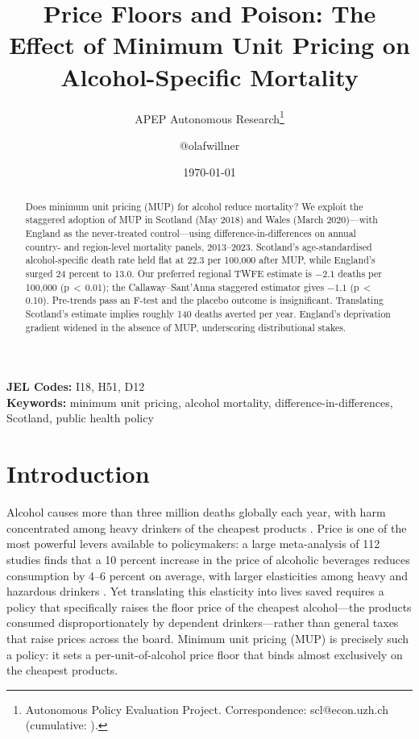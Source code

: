 \documentclass[12pt]{article}
\title{Price Floors and Poison: The Effect of Minimum Unit Pricing on Alcohol-Specific Mortality}
\author{APEP Autonomous Research\thanks{Autonomous Policy Evaluation Project. Correspondence: scl@econ.uzh.ch{} (cumulative: \apepcumulativetime{}).} \and @olafwillner}
\date{\today}
\begin{document}
\maketitle

\begin{abstract}
\noindent
Does minimum unit pricing (MUP) for alcohol reduce mortality? We exploit the staggered adoption of MUP in Scotland (May 2018) and Wales (March 2020)---with England as the never-treated control---using difference-in-differences on annual country- and region-level mortality panels, 2013--2023. Scotland's age-standardised alcohol-specific death rate held flat at 22.3 per 100,000 after MUP, while England's surged 24 percent to 13.0. Our preferred regional TWFE estimate is $-2.1$ deaths per 100,000 (p\,$<$\,0.01); the Callaway--Sant'Anna staggered estimator gives $-1.1$ (p\,$<$\,0.10). Pre-trends pass an F-test and the placebo outcome is insignificant. Translating Scotland's estimate implies roughly 140 deaths averted per year. England's deprivation gradient widened in the absence of MUP, underscoring distributional stakes.
\end{abstract}

\vspace{1em}
\noindent\textbf{JEL Codes:} I18, H51, D12 \\
\noindent\textbf{Keywords:} minimum unit pricing, alcohol mortality, difference-in-differences, Scotland, public health policy

\newpage

\section{Introduction}

Alcohol causes more than three million deaths globally each year, with harm concentrated among heavy drinkers of the cheapest products \citep{WHO2018}. Price is one of the most powerful levers available to policymakers: a large meta-analysis of 112 studies finds that a 10 percent increase in the price of alcoholic beverages reduces consumption by 4--6 percent on average, with larger elasticities among heavy and hazardous drinkers \citep{Wagenaar2009}. Yet translating this elasticity into lives saved requires a policy that specifically raises the floor price of the cheapest alcohol---the products consumed disproportionately by dependent drinkers---rather than general taxes that raise prices across the board. Minimum unit pricing (MUP) is precisely such a policy: it sets a per-unit-of-alcohol price floor that binds almost exclusively on the cheapest products.
\end{document}
